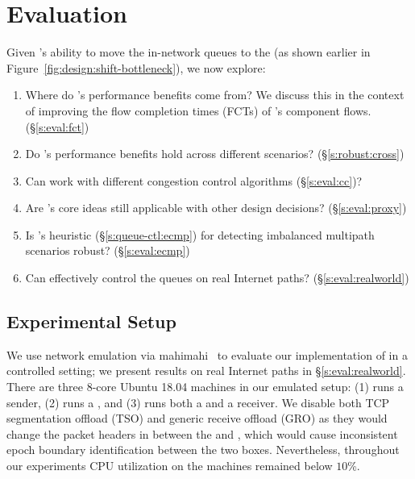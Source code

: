 \section{Evaluation}\label{s:eval}

Given \name's ability to move the in-network queues to the \inbox (as shown earlier in Figure~\ref{fig:design:shift-bottleneck}), we now explore:
\begin{enumerate}[leftmargin=15pt]
    \item Where do \name's performance benefits come from? We discuss this in the context of improving the flow completion times (FCTs) of \name's component flows. (\S\ref{s:eval:fct})
    \item Do \name's performance benefits hold across different scenarios? (\S\ref{s:robust:cross})
    \item Can \name work with different congestion control algorithms (\S\ref{s:eval:cc})?
    \item Are \name's core ideas still applicable with other design decisions? (\S\ref{s:eval:proxy})
    \item Is \name's heuristic (\S\ref{s:queue-ctl:ecmp}) for detecting imbalanced multipath scenarios robust? (\S\ref{s:eval:ecmp})  
    \item Can \name effectively control the queues on real Internet paths? (\S\ref{s:eval:realworld})
\end{enumerate}

\subsection{Experimental Setup}\label{s:eval:setup}

We use network emulation via mahimahi~\cite{mahimahi} to evaluate our implementation of \name in a controlled setting; we present results on real Internet paths in \S\ref{s:eval:realworld}.
There are three $8$-core Ubuntu 18.04 machines in our emulated setup: (1) runs a sender, (2) runs a \inbox, and (3) runs both a \outbox and a receiver.
We disable both TCP segmentation offload (TSO) and generic receive offload (GRO) as they would change the packet headers in between the \inbox and \outbox, which would cause inconsistent epoch boundary identification between the two boxes.
Nevertheless, throughout our experiments CPU utilization on the machines remained below $10$\%.

